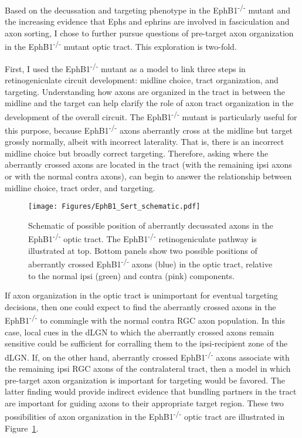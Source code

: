 \label{sec:BundleWidth}
Based on the decussation and targeting phenotype in the EphB1\textsuperscript{-/-} mutant and the increasing evidence that Ephs and ephrins are involved in fasciculation and axon sorting, I chose to further pursue questions of pre-target axon organization in the EphB1\textsuperscript{-/-} mutant optic tract.
This exploration is two-fold.

First, I used the EphB1\textsuperscript{-/-} mutant as a model to link three steps in retinogeniculate circuit development: midline choice, tract organization, and targeting.
Understanding how axons are organized in the tract in between the midline and the target can help clarify the role of axon tract organization in the development of the overall circuit.
The EphB1\textsuperscript{-/-} mutant is particularly useful for this purpose, because EphB1\textsuperscript{-/-} axons aberrantly cross at the midline but target grossly normally, albeit with incorrect laterality.
That is, there is an incorrect midline choice but broadly correct targeting.
Therefore, asking where the aberrantly crossed axons are located in the tract (with the remaining ipsi axons or with the normal contra axons), can begin to answer the relationship between midline choice, tract order, and targeting.
\begin{figure}[hbtp]
    \begin{center}
        \texttt{[image: Figures/EphB1\_Sert\_schematic.pdf]}
        \caption[Schematic of possible position of aberrantly decussated axons in the EphB1\textsuperscript{-/-} optic tract.]
        {Schematic of possible position of aberrantly decussated axons in the EphB1\textsuperscript{-/-} optic tract.
        The EphB1\textsuperscript{-/-} retinogeniculate pathway is illustrated at top.
        Bottom panels show two possible positions of aberrantly crossed EphB1\textsuperscript{-/-} axons (blue) in the optic tract, relative to the normal ipsi (green) and contra (pink) components.
        }
        \label{EphB1Sertschematic}
    \end{center}
\end{figure}

If axon organization in the optic tract is unimportant for eventual targeting decisions, then one could expect to find the aberrantly crossed axons in the EphB1\textsuperscript{-/-} to commingle with the normal contra RGC axon population.
In this case, local cues in the dLGN to which the aberrantly crossed axons remain sensitive could be sufficient for corralling them to the ipsi-recipient zone of the dLGN.
If, on the other hand, aberrantly crossed EphB1\textsuperscript{-/-} axons associate with the remaining ipsi RGC axons of the contralateral tract, then a model in which pre-target axon organization is important for targeting would be favored.
The latter finding would provide indirect evidence that bundling partners in the tract are important for guiding axons to their appropriate target region.
These two possibilities of axon organization in the EphB1\textsuperscript{-/-} optic tract are illustrated in Figure~\ref{EphB1Sertschematic}.

